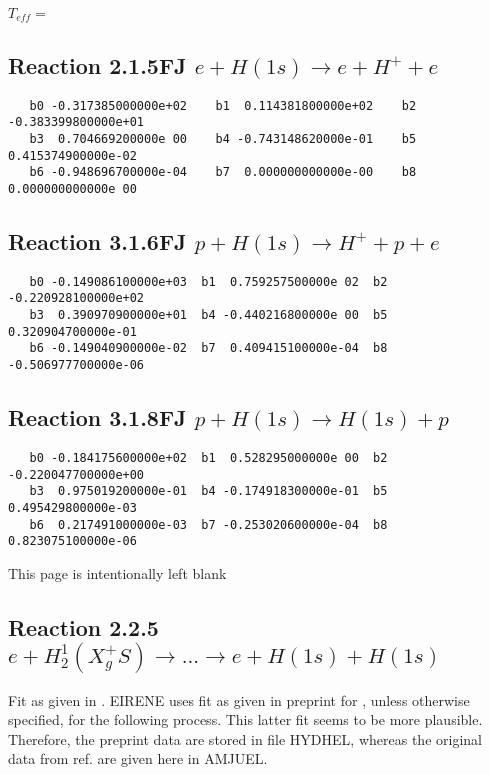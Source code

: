 $T_{eff} = $
\bigskip

\subsection{
Reaction 2.1.5FJ  $e + H (1s) \rightarrow e + H^+ + e$
}


\begin{verbatim}
   b0 -0.317385000000e+02    b1  0.114381800000e+02    b2 -0.383399800000e+01
   b3  0.704669200000e 00    b4 -0.743148620000e-01    b5  0.415374900000e-02
   b6 -0.948696700000e-04    b7  0.000000000000e-00    b8  0.000000000000e 00
\end{verbatim}

\subsection{
Reaction 3.1.6FJ  $p + H(1s) \rightarrow H^+ + p + e$
}


\begin{verbatim}
   b0 -0.149086100000e+03  b1  0.759257500000e 02  b2 -0.220928100000e+02
   b3  0.390970900000e+01  b4 -0.440216800000e 00  b5  0.320904700000e-01
   b6 -0.149040900000e-02  b7  0.409415100000e-04  b8 -0.506977700000e-06
\end{verbatim}

\subsection{
Reaction 3.1.8FJ  $p + H(1s) \rightarrow H(1s) + p  $
}


\begin{verbatim}
   b0 -0.184175600000e+02  b1  0.528295000000e 00  b2 -0.220047700000e+00
   b3  0.975019200000e-01  b4 -0.174918300000e-01  b5  0.495429800000e-03
   b6  0.217491000000e-03  b7 -0.253020600000e-04  b8  0.823075100000e-06
\end{verbatim}

\newpage
This page is intentionally left blank
\newpage


\subsection{
Reaction 2.2.5
$e + H_2^1 (X_g^+ S ) \rightarrow . . .\rightarrow e + H(1s) + H(1s)$}


Fit as given in \cite{kn:Janev}.
      EIRENE uses fit as given in preprint for \cite{kn:Janev},
      unless otherwise specified, for the following process.
      This latter fit seems to be more plausible. Therefore, the
      preprint data are stored in file HYDHEL, whereas the original
      data from ref.\cite{kn:Janev} are given here in AMJUEL.



